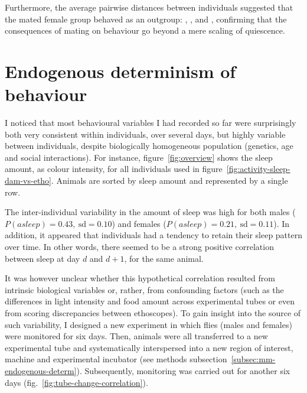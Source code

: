 Furthermore, the average pairwise distances
between individuals suggested that the mated female group behaved as an outgroup:
,
, and
,
confirming that the consequences of mating on behaviour go beyond a mere scaling of quiescence.


\section{Endogenous determinism of behaviour}

I noticed that most behavioural variables I had recorded so far were surprisingly both very consistent within individuals, over several days, but highly variable between individuals, despite biologically homogeneous population (genetics, age and social interactions). 
For instance, figure~\ref{fig:overview} shows the sleep amount, as colour intensity, for all individuals used in figure~\ref{fig:activity-sleep-dam-vs-etho}.
Animals are sorted by sleep amount and represented by a single row.



The inter-individual variability in the amount of sleep was high for both males ($P(asleep) = 0.43,~\text{sd} = 0.10$) and females ($P(asleep) = 0.21,~\text{sd} = 0.11$).
In addition, it appeared that individuals had a tendency to retain their sleep pattern over time.
In other words, there seemed to be a strong positive correlation between sleep at day $d$ and $d+1$, for the same animal.


It was however unclear whether this hypothetical correlation resulted from intrinsic biological variables or, rather, from confounding factors (such as the differences in light intensity and food amount across experimental tubes or even from scoring discrepancies between ethoscopes).
To gain insight into the source of such variability, I designed a new experiment in which flies (males and females) were monitored for six days.
Then, animals were all transferred to a new experimental tube and systematically interspersed into a new region of interest, machine and experimental incubator (see methods subsection~\ref{subsec:mm-endogenous-determ}). 
Subsequently, monitoring was carried out for another six days (fig.~\ref{fig:tube-change-correlation}). 




